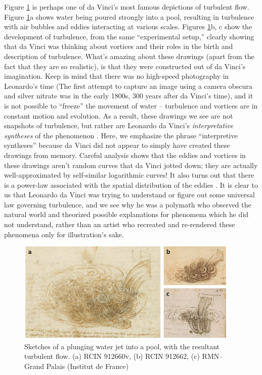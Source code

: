 \documentclass[12pt]{article}
\begin{document}
Figure \ref{fig:6} is perhaps one of da Vinci's most famous depictions of turbulent flow. Figure \ref{fig:6}a shows water being poured strongly into a pool, resulting in turbulence with air bubbles and eddies interacting at various scales. Figures \ref{fig:6}b, c show the development of turbulence, from the same ``experimental setup,'' clearly showing that da Vinci was thinking about {vortices} and their roles in the birth and description of turbulence. What's amazing about these drawings (apart from the fact that they are so realistic), is that they were constructed out of da Vinci's imagination. Keep in mind that there was no high-speed photography in Leonardo's time (The first attempt to capture an image using a camera obscura and silver nitrate was in the early 1800s, 300 years after da Vinci's time), and it is not possible to ``freeze'' the movement of water -- turbulence and vortices are in constant motion and evolution. As a result, these drawings we see are not snapshots of turbulence, but rather are Leonardo da Vinci's \textit{interpretative syntheses} of the phenomenon \cite{marusic2021leonardo}. Here, we emphasize the phrase ``interpretive syntheses'' because da Vinci did not appear to simply have created these drawings from memory. Careful analysis shows that the eddies and vortices in these drawings aren't random curves that da Vinci jotted down; they are actually well-approximated by self-similar logarithmic curves! It also turns out that there is a power-law associated with the spatial distribution of the eddies \cite{marusic2021leonardo}. It is clear to us that Leonardo da Vinci was trying to understand or figure out some universal law governing turbulence, and we see why he was a polymath who observed the natural world and theorized possible explanations for phenomena which he did not understand, rather than an artist who recreated and re-rendered these phenomena only for illustration's sake.\\



\begin{figure}[!htb]
	\centering
	\includegraphics[width=0.95\textwidth]{LdV_6}
	\caption{Sketches of a plunging water jet into a pool, with the resultant turbulent flow. (a) RCIN 912660v, (b) RCIN 912662, (c) RMN–Grand Palais (Institut de France)}
	\label{fig:6}
\end{figure}
\end{document}
